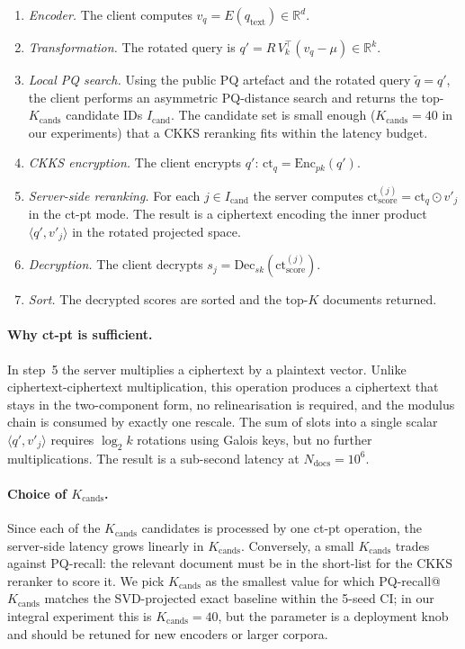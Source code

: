 \documentclass[11pt,a4paper]{article}
\begin{document}
\begin{enumerate}[leftmargin=22pt,topsep=2pt,itemsep=2pt]
\item \emph{Encoder.} The client computes
$v_q = E(q_{\mathrm{text}}) \in \mathbb{R}^d$.
\item \emph{Transformation.} The rotated query is
$q' = R\, V_k^\top (v_q - \mu) \in \mathbb{R}^k$.
\item \emph{Local PQ search.} Using the public PQ artefact and the
rotated query $\tilde q = q'$, the client performs an asymmetric
PQ-distance search and returns the top-$K_{\mathrm{cands}}$ candidate
IDs $I_{\mathrm{cand}}$. The candidate set is small enough
($K_{\mathrm{cands}} = 40$ in our experiments) that a CKKS reranking
fits within the latency budget.
\item \emph{CKKS encryption.} The client encrypts $q'$:
$\mathrm{ct}_q = \mathrm{Enc}_{pk}(q')$.
\item \emph{Server-side reranking.} For each $j \in I_{\mathrm{cand}}$
the server computes
$\mathrm{ct}_{\mathrm{score}}^{(j)} = \mathrm{ct}_q \odot v'_j$
in the ct-pt mode. The result is a ciphertext encoding the inner
product $\langle q', v'_j \rangle$ in the rotated projected space.
\item \emph{Decryption.} The client decrypts
$s_j = \mathrm{Dec}_{sk}(\mathrm{ct}_{\mathrm{score}}^{(j)})$.
\item \emph{Sort.} The decrypted scores are sorted and the top-$K$
documents returned.
\end{enumerate}

\paragraph{Why ct-pt is sufficient.} In step~5 the server multiplies a
ciphertext by a plaintext vector. Unlike ciphertext-ciphertext
multiplication, this operation produces a ciphertext that stays in the
two-component form, no relinearisation is required, and the modulus chain
is consumed by exactly one rescale. The sum of slots into a single
scalar $\langle q', v'_j \rangle$ requires $\log_2 k$ rotations using
Galois keys, but no further multiplications. The result is a sub-second
latency at $N_{\mathrm{docs}} = 10^6$.

\paragraph{Choice of $K_{\mathrm{cands}}$.} Since each of the
$K_{\mathrm{cands}}$ candidates is processed by one ct-pt operation, the
server-side latency grows linearly in $K_{\mathrm{cands}}$. Conversely, a
small $K_{\mathrm{cands}}$ trades against PQ-recall: the relevant
document must be in the short-list for the CKKS reranker to score it.
We pick $K_{\mathrm{cands}}$ as the smallest value for which
PQ-recall@$K_{\mathrm{cands}}$ matches the SVD-projected exact baseline
within the 5-seed CI; in our integral experiment this is
$K_{\mathrm{cands}} = 40$, but the parameter is a deployment knob and
should be retuned for new encoders or larger corpora.
\end{document}
